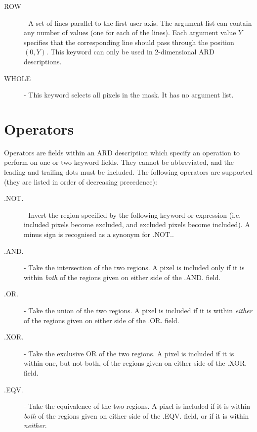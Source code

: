 \documentclass[11pt,nolof]{starlink}
\begin{document}
\begin{description}
\item [\label{KEY:ROW}ROW] - A set of lines parallel to the first user axis.
The argument list can contain any number of values (one for each of the
lines). Each argument value $Y$ specifies that the corresponding line
should pass through the position $(0,Y)$. This keyword can only be used
in 2-dimensional ARD descriptions.

\item [\label{KEY:WHO}WHOLE] - This keyword selects all pixels in the mask. It
has no argument list.

\end{description}

\section{\label{SEC:OPER}Operators}
Operators are fields within an ARD description which specify an operation to
perform on one or two keyword fields. They cannot be abbreviated, and the
leading and trailing dots must be included. The following operators are
supported (they are listed in order of decreasing precedence):

\begin{description}

\item [\label{OP:NOT}.NOT.] - Invert the region specified by the following keyword or
expression (i.e. included pixels become excluded, and excluded pixels become
included). A minus sign is recognised as a synonym for .NOT..

\item [\label{OP:AND}.AND.] - Take the intersection of the two regions. A pixel is included
only if it is within \emph{both} of the regions given on either side of the
.AND. field.

\item [\label{OP:OR}.OR.] - Take the union of the two regions. A pixel is included if it is
within \emph{either} of the regions given on either side of the .OR. field.

\item [\label{OP:XOR}.XOR.] - Take the exclusive OR of the two regions. A pixel is included if
it is within one, but not both, of the regions given on either side of the .XOR.
field.

\item [\label{OP:EQV}.EQV.] - Take the equivalence of the two regions. A pixel is included if
it is within \emph{both} of the regions given on either side of the .EQV. field,
or if it is within \emph{neither}.

\end{description}
\end{document}
